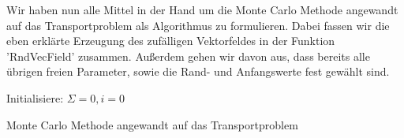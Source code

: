 Wir haben nun alle Mittel in der Hand um die Monte Carlo Methode angewandt auf das Transportproblem als Algorithmus zu formulieren. Dabei fassen wir die eben erklärte Erzeugung des zufälligen Vektorfeldes in der Funktion 'RndVecField' zusammen.
Außerdem gehen wir davon aus, dass bereits alle übrigen freien Parameter, sowie die Rand- und Anfangswerte fest gewählt sind.
\begin{algorithm}[H]
	\DontPrintSemicolon
	\SetAlgoLined
	\BlankLine
	Initialisiere: $ \Sigma =0, i=0 $\;
	\BlankLine
	\caption{Monte Carlo Methode angewandt auf das Transportproblem}
\end{algorithm}\bigskip %

